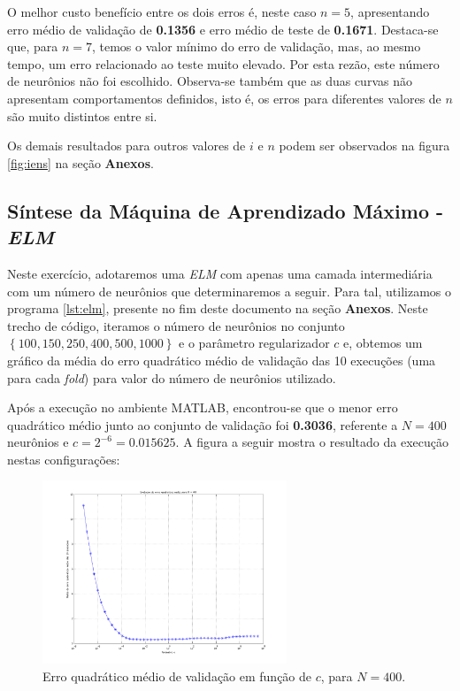 O melhor custo benefício entre os dois erros é, neste caso \(n = 5\),
apresentando erro médio de validação de \textbf{0.1356} e erro médio de teste de \textbf{0.1671}.
Destaca-se que, para \(n=7\), temos o valor mínimo do erro de validação, mas, ao
mesmo tempo, um erro relacionado ao teste muito elevado. Por esta rezão, este
número de neurônios não foi escolhido.  Observa-se também que as duas curvas não
apresentam comportamentos definidos, isto é, os erros para diferentes valores de
\(n\) são muito distintos entre si.

\vspace{12pt}

Os demais resultados para outros valores de \(i\) e \(n\) podem ser observados
na figura \ref{fig:iens} na seção \textbf{Anexos}. 


\subsection{Síntese da Máquina de Aprendizado Máximo - \textit{ELM}}
\label{sec:elm}

Neste exercício, adotaremos uma \textit{ELM} com apenas uma camada
intermediária com um número de neurônios que determinaremos a seguir. Para tal,
utilizamos o programa \ref{lst:elm}, presente no fim deste documento na seção
\textbf{Anexos}. Neste trecho de código, iteramos o número de neurônios no
conjunto  \( \left\{ 100, 150, 250, 400, 500, 1000  \right\} \) e o parâmetro
regularizador \(c\) e, obtemos um gráfico da média do erro quadrático médio de
validação das 10 execuções (uma para cada \textit{fold}) para valor do número
de neurônios utilizado.

\vspace{12pt}

Após a execução no ambiente MATLAB, encontrou-se que o menor erro quadrático
médio junto ao conjunto de validação foi \textbf{0.3036}, referente a \(N =
400\) neurônios e \(c=2^{-6}=0.015625\). A figura a seguir mostra o resultado da
execução nestas configurações:

	\begin{figure}[H]
			\centering
			  \includegraphics[width=0.650\textwidth]{image/elm_400_neurons}
			  \caption{Erro quadrático médio de validação em função de \(c\),
			  para \(N=400\).}
			  \label{fig:elm400}
	\end{figure}
	
